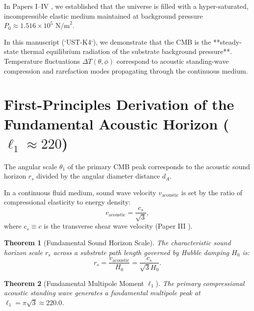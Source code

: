 \documentclass[11pt,a4paper]{article}
\newtheorem{thm}{Theorem}
\begin{document}
	In Papers I--IV \cite{PaperI, PaperII, PaperIII, PaperIV}, we established that the universe is filled with a hyper-saturated, incompressible elastic medium maintained at background pressure $P_0 \approx 1.516 \times 10^5 \text{ N/m}^2$.
	
	In this manuscript (`UST-K4`), we demonstrate that the CMB is the **steady-state thermal equilibrium radiation of the substrate background pressure**. Temperature fluctuations $\Delta T(\theta, \phi)$ correspond to acoustic standing-wave compression and rarefaction modes propagating through the continuous medium.
	
	\section{First-Principles Derivation of the Fundamental Acoustic Horizon ($\ell_1 \approx 220$)}
	\label{sec:fundamental_peak}
	
	The angular scale $\theta_1$ of the primary CMB peak corresponds to the acoustic sound horizon $r_s$ divided by the angular diameter distance $d_A$.
	
	In a continuous fluid medium, sound wave velocity $v_{\text{acoustic}}$ is set by the ratio of compressional elasticity to energy density:
	\begin{equation}
		v_{\text{acoustic}} = \frac{c_s}{\sqrt{3}},
		\label{eq:fluid_sound_speed}
	\end{equation}
	where $c_s \equiv c$ is the transverse shear wave velocity (Paper III \cite{PaperIII}).
	
	\begin{thm}[Fundamental Sound Horizon Scale]
		\label{thm:sound_horizon}
		The characteristic sound horizon scale $r_s$ across a substrate path length governed by Hubble damping $H_0$ is:
		\begin{equation}
			r_s = \frac{v_{\text{acoustic}}}{H_0} = \frac{c_s}{\sqrt{3} H_0}.
			\label{eq:sound_horizon_formula}
		\end{equation}
	\end{thm}
	
	\begin{thm}[Fundamental Multipole Moment $\ell_1$]
		\label{thm:fundamental_peak_derived}
		The primary compressional acoustic standing wave generates a fundamental multipole peak at $\ell_1 = \pi\sqrt{3} \approx \mathbf{220.0}$.
	\end{thm}
	
\end{document}
